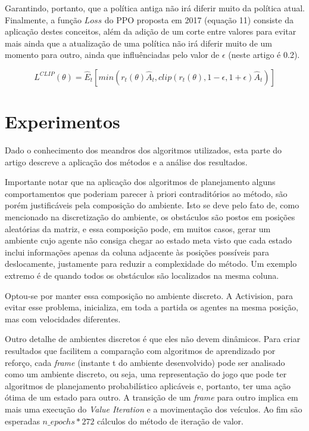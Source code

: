 \documentclass[letterpaper]{article} %
\begin{document}
Garantindo, portanto, que a política antiga não irá diferir muito da política atual. Finalmente, a função $Loss$ do PPO proposta em 2017 (equação 11) consiste da aplicação destes conceitos, além da adição de um corte entre valores para evitar mais ainda que a atualização de uma política não irá diferir muito de um momento para outro, ainda que influênciadas pelo valor de $\epsilon$ (neste artigo é 0.2).

\begin{equation}
L^{CLIP}(\theta) =  \hat{E}_t[min(r_t(\theta) \hat{A}_t, clip(r_t(\theta), 1 - \epsilon, 1 + \epsilon) \hat{A}_t)]
\end{equation}


\section{Experimentos}
Dado o conhecimento dos meandros dos algoritmos utilizados, esta parte do artigo descreve a aplicação dos métodos e a análise dos resultados.

Importante notar que na aplicação dos algoritmos de planejamento alguns comportamentos que poderiam parecer à priori contraditórios ao método, são porém justificáveis pela composição do ambiente. Isto se deve pelo fato de, como mencionado na discretização do ambiente, os obstáculos são postos em posições aleatórias da matriz, e essa composição pode, em muitos casos, gerar um ambiente cujo agente não consiga chegar ao estado meta visto que cada estado inclui informações apenas da coluna adjacente às posições possíveis para deslocamente, justamente para reduzir a complexidade do método. Um exemplo extremo é de quando todos os obstáculos são localizados na mesma coluna.

Optou-se por manter essa composição no ambiente discreto. A Activision, para evitar esse problema, inicializa, em toda a partida os agentes na mesma posição, mas com velocidades diferentes.

Outro detalhe de ambientes discretos é que eles não devem dinâmicos. Para criar resultados que facilitem a comparação com algoritmos de aprendizado por reforço, cada \textit{frame} (instante t do ambiente desenvolvido) pode ser analisado como um ambiente discreto, ou seja, uma representação do jogo que pode ter algoritmos de planejamento probabilístico aplicáveis e, portanto, ter uma ação ótima de um estado para outro. A transição de um \textit{frame} para outro implica em mais uma execução do \textit{Value Iteration} e a movimentação dos veículos. Ao fim são esperadas $n\_epochs * 272$  cálculos do método de iteração de valor. 
\end{document}
